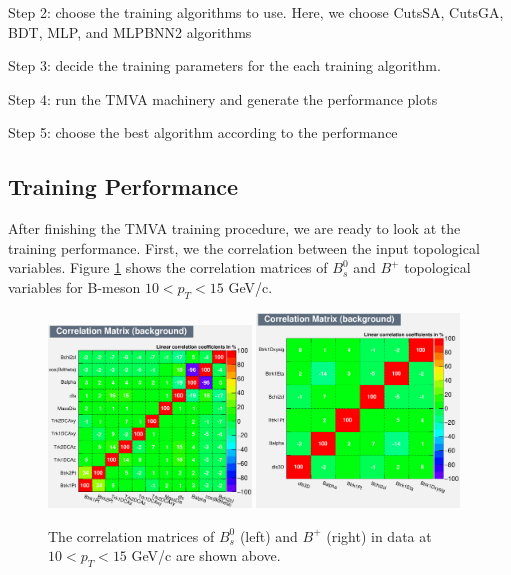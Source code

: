 Step 2: choose the training algorithms to use. Here, we choose CutsSA, CutsGA, BDT, MLP, and MLPBNN2 algorithms

Step 3: decide the training parameters for the each training algorithm. 

Step 4: run the TMVA machinery and generate the performance plots 

Step 5: choose the best algorithm according to the performance


\subsection{Training Performance}

After finishing the TMVA training procedure, we are ready to look at the training performance. First, we the correlation between the input topological variables. Figure \ref{CorrMatrix} shows the correlation matrices of $B^0_s$ and $B^+$ topological variables for B-meson $10 < p_T < 15$ GeV/c.

\begin{figure}[h]
\begin{center}
\includegraphics[width= 0.48\textwidth]{Figures/Chapter5/BsCorr_10_15.eps}
\includegraphics[width= 0.48\textwidth]{Figures/Chapter5/BPCorr_10_15.pdf}
\caption{The correlation matrices of $B^0_s$ (left) and $B^+$ (right) in data at $10 < p_T < 15$ GeV/c are shown above.}
\label{CorrMatrix}
\end{center}
\end{figure}

